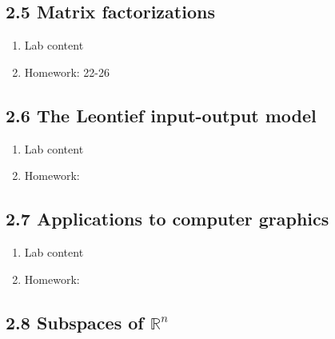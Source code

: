 \documentclass{article}
\begin{document}
\subsection{2.5 Matrix factorizations}

\begin{enumerate}

\item Lab content

\item Homework: 22-26

\end{enumerate}

\subsection{2.6 The Leontief input-output model}

\begin{enumerate}

\item Lab content


\item Homework: 

\end{enumerate}

\subsection{2.7 Applications to computer graphics}

\begin{enumerate}

\item Lab content

\item Homework: 

\end{enumerate}

\subsection{2.8 Subspaces of $\mathbb{R}^n$}
\end{document}
